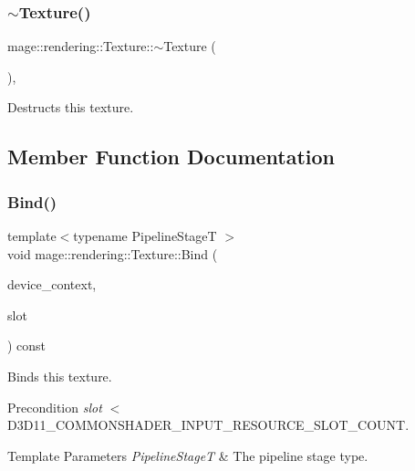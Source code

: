 \subsubsection{\texorpdfstring{$\sim$\+Texture()}{~Texture()}}
{\footnotesize\ttfamily mage\+::rendering\+::\+Texture\+::$\sim$\+Texture (\begin{DoxyParamCaption}{ }\end{DoxyParamCaption})\hspace{0.3cm}{\ttfamily [virtual]}, {\ttfamily [default]}}

Destructs this texture. 

\subsection{Member Function Documentation}
\mbox{\label{classmage_1_1rendering_1_1_texture_a2189fabd729f433b96b62fa409968677}} 
\subsubsection{\texorpdfstring{Bind()}{Bind()}}
{\footnotesize\ttfamily template$<$typename Pipeline\+StageT $>$ \\
void mage\+::rendering\+::\+Texture\+::\+Bind (\begin{DoxyParamCaption}\item[{I\+D3\+D11\+Device\+Context \&}]{device\+\_\+context,  }\item[{\mbox{\hyperlink{namespacemage_aa5d6eaabaac3cdd01873d6a3d27e90f3}{U32}}}]{slot }\end{DoxyParamCaption}) const\hspace{0.3cm}{\ttfamily [noexcept]}}

Binds this texture.

\begin{DoxyPrecond}{Precondition}
{\itshape slot} $<$ {\ttfamily D3\+D11\+\_\+\+C\+O\+M\+M\+O\+N\+S\+H\+A\+D\+E\+R\+\_\+\+I\+N\+P\+U\+T\+\_\+\+R\+E\+S\+O\+U\+R\+C\+E\+\_\+\+S\+L\+O\+T\+\_\+\+C\+O\+U\+NT}. 
\end{DoxyPrecond}

\begin{DoxyTemplParams}{Template Parameters}
{\em Pipeline\+StageT} & The pipeline stage type. \\
\hline
\end{DoxyTemplParams}

